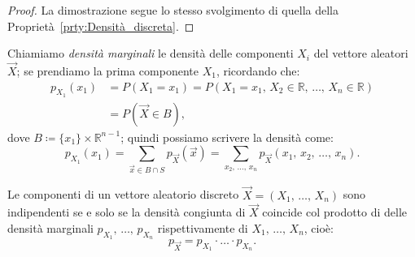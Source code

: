         \begin{proof}
            La dimostrazione segue lo stesso svolgimento di quella della Proprietà~\ref{prty:Densità_discreta}.
        \end{proof}
        \begin{defn}\label{defn:Densità_marginali}
            Chiamiamo \textit{densità marginali} le densità delle componenti $X_i$ del vettore aleatori $\vec{X}$; se prendiamo la prima componente $X_1$, ricordando che:
            \begin{align*}
                p_{X_1}(x_1) &= P(X_1 = x_1) = P(X_1 = x_1,\, X_2 \in \mathbb{R},\, \ldots,\, X_n \in \mathbb{R}) \\
                             &= P(\vec{X} \in B)
            ,\end{align*}
            dove $B \coloneqq \{x_1\} \times \mathbb{R}^{n-1}$; quindi possiamo scrivere la densità come:
            \begin{equation}\label{eq:Densità_marginali}
                p_{X_1}(x_1) = \!\! \sum_{\vec{x} \in B \cap S} \!\! p_{\vec{X}}(\vec{x}) 
                = \!\! \sum_{x_2,\, \ldots,\, x_{n}} \!\! p_{\vec{X}}(x_1,\, x_2,\, \ldots,\, x_{n})
            .\end{equation}
        \end{defn}
        \begin{prty}\label{prty:Indipendenza_componenti_densità}
            Le componenti di un vettore aleatorio discreto $\vec{X} = (X_1,\, \ldots,\, X_{n})$ sono indipendenti se e solo se la densità congiunta di $\vec{X}$ coincide col prodotto di delle densità marginali $p_{X_1},\, \ldots,\, p_{X_n}$ rispettivamente di $X_1,\, \ldots,\, X_{n}$, cioè: \[
            p_{\vec{X}} = p_{X_1} \cdot \ldots \cdot p_{X_n}
            .\]
        \end{prty}
